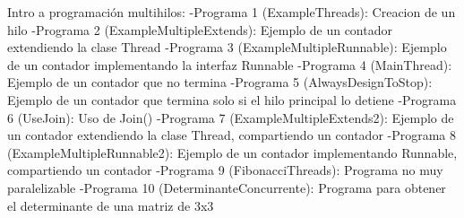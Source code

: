 Intro a programación multihilos: 
  -Programa 1 (ExampleThreads): Creacion de un hilo
  -Programa 2 (ExampleMultipleExtends): Ejemplo de un contador extendiendo la clase Thread
  -Programa 3 (ExampleMultipleRunnable): Ejemplo de un contador implementando la interfaz Runnable
  -Programa 4 (MainThread): Ejemplo de un contador que no termina
  -Programa 5 (AlwaysDesignToStop): Ejemplo de un contador que termina solo si el hilo principal lo detiene
  -Programa 6 (UseJoin): Uso de Join()
  -Programa 7 (ExampleMultipleExtends2): Ejemplo de un contador extendiendo la clase Thread, compartiendo un contador
  -Programa 8 (ExampleMultipleRunnable2): Ejemplo de un contador implementando Runnable, compartiendo un contador
  -Programa 9 (FibonacciThreads): Programa no muy paralelizable
  -Programa 10 (DeterminanteConcurrente): Programa para obtener el determinante de una matriz de 3x3